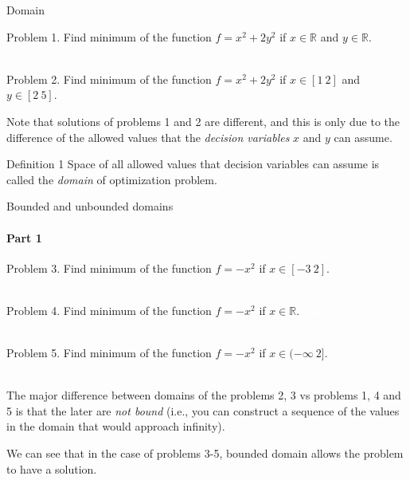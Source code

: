 \documentclass{beamer}
\begin{document}
\begin{frame}{Domain}
	\begin{flushleft}
		
		Problem 1. Find minimum of the function $f = x^2 + 2y^2$ if $x \in \mathbb{R}$ and $y \in \mathbb{R}$. \textcolor{white}{Solution is $x = 0$, $y = 0$.}
		
		\bigskip
		
		Problem 2. Find minimum of the function $f = x^2 + 2y^2$ if $x \in [1 \ 2]$ and $y \in [2 \ 5]$. \textcolor{white}{Solution is $x = 1$, $y = 2$.}
		
		\bigskip
		
		Note that solutions of problems 1 and 2 are different, and this is only due to the difference of the allowed values that the \emph{decision variables} $x$ and $y$ can assume.
		
		\begin{block}{Definition 1}
			Space of all allowed values that decision variables can assume is called the \emph{domain} of optimization problem.
		\end{block}
		
	\end{flushleft}
\end{frame}



\begin{frame}{Bounded and unbounded domains}
	\framesubtitle{Part 1}
	\begin{flushleft}
		
		Problem 3. Find minimum of the function $f = -x^2$ if $x \in [-3 \ 2]$. \textcolor{white}{Solution is $x = -3$.}
		
		\bigskip
		
		Problem 4. Find minimum of the function $f = -x^2$ if $x \in \mathbb{R}$. \textcolor{white}{The problem has no solution.}
		
		\bigskip
		
		Problem 5. Find minimum of the function $f = -x^2$ if $x \in  (-\infty \ 2]$. \textcolor{white}{The problem has no solution.}
		
		\bigskip
		
		The major difference between domains of the problems 2, 3 vs problems 1, 4 and 5 is that the later are \emph{not bound} (i.e., you can construct a sequence of the values in the domain that would approach infinity).
		
		\bigskip
		
		We can see that in the case of problems 3-5, bounded domain allows the problem to have a solution.
		
	\end{flushleft}
\end{frame}
\end{document}
